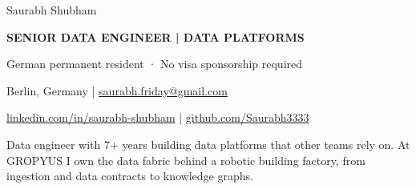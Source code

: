 \documentclass[11pt,a4paper]{article}
\begin{document}
\normalsize

\begin{center}
  {\namefont Saurabh Shubham}\par
  \vspace{2pt}
  {\bfseries SENIOR DATA ENGINEER | DATA PLATFORMS}\par
  \vspace{4pt}
  German permanent resident · No visa sponsorship required\par
  Berlin, Germany | \href{mailto:saurabh.friday@gmail.com}{saurabh.friday@gmail.com}\par
  \href{https://www.linkedin.com/in/saurabh-shubham/}{linkedin.com/in/saurabh-shubham} |
  \href{https://github.com/Saurabh3333}{github.com/Saurabh3333}
\end{center}
\vspace{-5pt}
\cvbodyfont
{}
Data engineer with 7+ years building data platforms that other teams rely on. At GROPYUS I own the data fabric behind a robotic building factory, from ingestion and data contracts to knowledge graphs.
\end{document}
